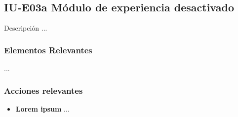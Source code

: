 
\subsection{IU-E03a Módulo de experiencia desactivado}

 Descripción ...


\subsubsection{Elementos Relevantes}

    \begin{description}
     ...
    \end{description}

\subsubsection{Acciones relevantes}

    \begin{itemize}
    \item {\bf Lorem ipsum}
        ...
    \end{itemize}

\clearpage
